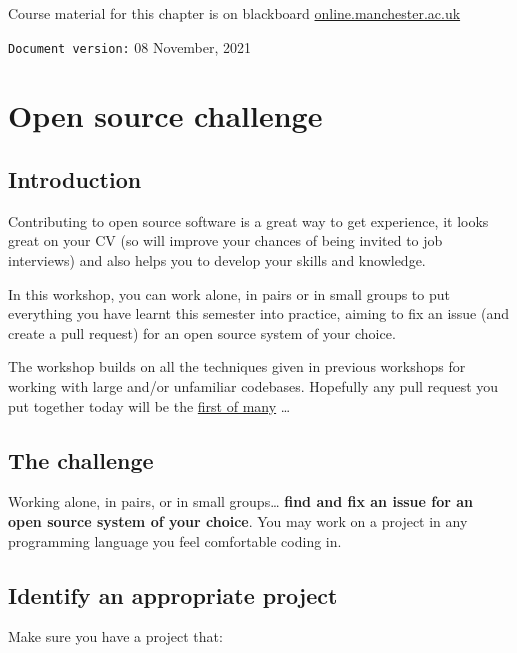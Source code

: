 \documentclass[
]{book}
\begin{document}
Course material for this chapter is on blackboard \href{https://online.manchester.ac.uk}{online.manchester.ac.uk}

\texttt{Document\ version:} 08 November, 2021

\hypertarget{opening}{%
\chapter{Open source challenge}\label{opening}}

\hypertarget{introduction-1}{%
\section{Introduction}\label{introduction-1}}

Contributing to open source software is a great way to get experience, it looks great on your CV (so will improve your chances of being invited to job interviews) and also helps you to develop your skills and knowledge. \citep{experiencing, spinellis}

In this workshop, you can work alone, in pairs or in small groups to put everything you have learnt this semester into practice, aiming to fix an issue (and create a pull request) for an open source system of your choice.

The workshop builds on all the techniques given in previous workshops for working with large and/or unfamiliar codebases.
Hopefully any pull request you put together today will be the \href{http://firstpr.me}{first of many} \ldots{}

\hypertarget{challenge}{%
\section{The challenge}\label{challenge}}

Working alone, in pairs, or in small groups\ldots{} \textbf{find and fix an issue for an open source system of your choice}.
You may work on a project in any programming language you feel comfortable coding in.

\hypertarget{projecti}{%
\section{Identify an appropriate project}\label{projecti}}

Make sure you have a project that:
\end{document}
